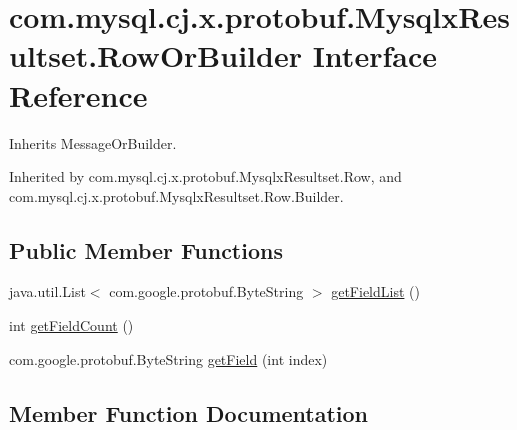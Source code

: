 \hypertarget{interfacecom_1_1mysql_1_1cj_1_1x_1_1protobuf_1_1_mysqlx_resultset_1_1_row_or_builder}{}\section{com.\+mysql.\+cj.\+x.\+protobuf.\+Mysqlx\+Resultset.\+Row\+Or\+Builder Interface Reference}
\label{interfacecom_1_1mysql_1_1cj_1_1x_1_1protobuf_1_1_mysqlx_resultset_1_1_row_or_builder}


Inherits Message\+Or\+Builder.



Inherited by com.\+mysql.\+cj.\+x.\+protobuf.\+Mysqlx\+Resultset.\+Row, and com.\+mysql.\+cj.\+x.\+protobuf.\+Mysqlx\+Resultset.\+Row.\+Builder.

\subsection*{Public Member Functions}
\begin{DoxyCompactItemize}
\item 
java.\+util.\+List$<$ com.\+google.\+protobuf.\+Byte\+String $>$ \mbox{\hyperlink{interfacecom_1_1mysql_1_1cj_1_1x_1_1protobuf_1_1_mysqlx_resultset_1_1_row_or_builder_a8e930d8dbfadedb6077e2c7b6e3a96a7}{get\+Field\+List}} ()
\item 
int \mbox{\hyperlink{interfacecom_1_1mysql_1_1cj_1_1x_1_1protobuf_1_1_mysqlx_resultset_1_1_row_or_builder_a353ab4361cfa21b39195ed78d9d5527b}{get\+Field\+Count}} ()
\item 
com.\+google.\+protobuf.\+Byte\+String \mbox{\hyperlink{interfacecom_1_1mysql_1_1cj_1_1x_1_1protobuf_1_1_mysqlx_resultset_1_1_row_or_builder_a088ee18ca774ad4299da1b28fd1689bb}{get\+Field}} (int index)
\end{DoxyCompactItemize}


\subsection{Member Function Documentation}
\mbox{\label{interfacecom_1_1mysql_1_1cj_1_1x_1_1protobuf_1_1_mysqlx_resultset_1_1_row_or_builder_a088ee18ca774ad4299da1b28fd1689bb}} 
